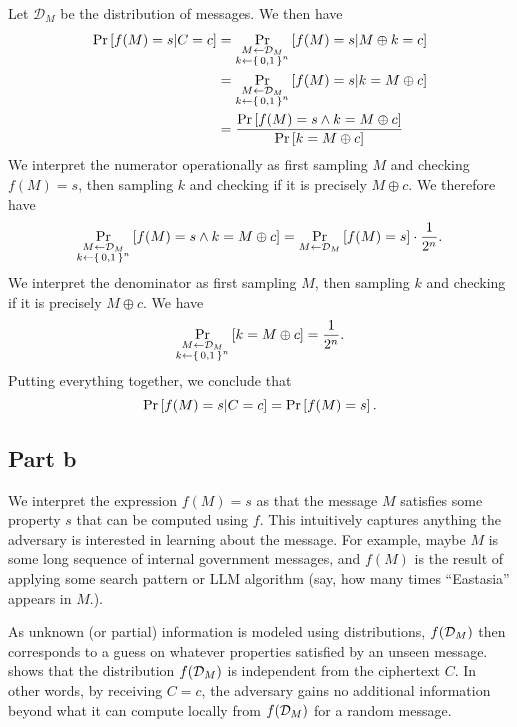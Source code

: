 \documentclass{article}
\begin{document}
Let $\mathcal{D}_M$ be the distribution of messages.
We then have
\begin{align*}
   \Pr\left[f(M)=s | C=c\right]
   &=\Pr_{\substack{M\gets\mathcal{D}_M \\ k\gets\set{0, 1}^n}}\left[f(M)=s | M\oplus k=c\right] \\
    &=\Pr_{\substack{M\gets\mathcal{D}_M \\ k\gets\set{0, 1}^n}}\left[f(M)=s | k=M\oplus c\right] \\
    &= \frac{\Pr\left[f(M)=s \wedge k=M\oplus c\right]}{\Pr\left[k=M\oplus c\right]}
\end{align*}
We interpret the numerator operationally as first sampling $M$ and checking $f(M) = s$, then sampling $k$ and checking if it is precisely $M\oplus c$.
We therefore have
\begin{equation*}
    \Pr_{\substack{M\gets\mathcal{D}_M \\ k\gets\set{0, 1}^n}}\left[f(M)=s \wedge k=M\oplus c\right] = \Pr_{\substack{M\gets\mathcal{D}_M}}\left[f(M)=s\right]\cdot \frac{1}{2^n}.
\end{equation*}
We interpret the denominator as first sampling $M$, then sampling $k$ and checking if it is precisely $M\oplus c$.
We have
\begin{equation*}
    \Pr_{\substack{M\gets\mathcal{D}_M \\ k\gets\set{0, 1}^n}}\left[k=M\oplus c\right] = \frac{1}{2^n}.
\end{equation*}
Putting everything together, we conclude that
\begin{equation}
    \label{eq:otp-property}
    \Pr\left[f(M)=s | C=c\right] =
    \Pr\left[f(M)=s\right].
\end{equation}

\subsection*{Part b}

We interpret the expression $f(M)=s$ as that the message $M$ satisfies some property $s$ that can be computed using $f$.
This intuitively captures anything the adversary is interested in learning about the message.
For example, maybe $M$ is some long sequence of internal government messages, and $f(M)$ is the result of applying some search pattern or LLM algorithm (say, how many times ``Eastasia'' appears in $M$.).

As unknown (or partial) information is modeled using distributions, $f(\mathcal{D}_{M})$ then corresponds to a guess on whatever properties satisfied by an unseen message.
 shows that the distribution $f(\mathcal{D}_{M})$ is independent from the ciphertext $C$.
In other words, by receiving $C=c$, the adversary gains no additional information beyond what it can compute locally from $f(\mathcal{D}_{M})$ for a random message.
\end{document}
